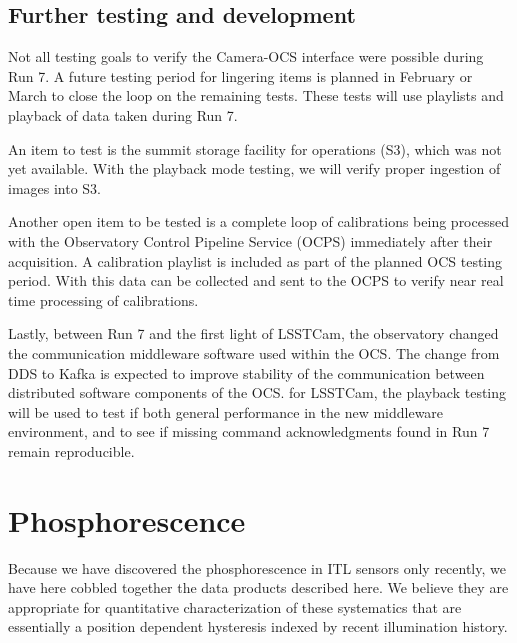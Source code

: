\subsection{Further testing and development}
Not all testing goals to verify the Camera-OCS interface were possible during Run 7. A future testing period for lingering items is planned in February or March to close the loop on the remaining tests. These tests will use playlists and playback of data taken during Run 7.

An item to test is the summit storage facility for operations (S3), which was not yet available. With the playback mode testing, we will verify proper ingestion of images into S3.

Another open item to be tested is a complete loop of calibrations being processed with the Observatory Control Pipeline Service (OCPS) immediately after their acquisition. A calibration playlist is included as part of the planned OCS testing period. With this data can be collected and sent to the OCPS to verify near real time processing of calibrations.

Lastly, between Run 7 and the first light of LSSTCam, the observatory changed the communication middleware software used within the OCS. The change from DDS to Kafka is expected to improve stability of the communication between distributed software components of the OCS. for LSSTCam, the playback testing will be used to test if both general performance in the new middleware environment, and to see if missing command acknowledgments found in Run 7 remain reproducible. 

\clearpage
\section{Phosphorescence}\label{appendix:phosphorescence}
Because we have discovered the phosphorescence in ITL sensors only recently, we have here cobbled together the data products described here. We believe they are appropriate for quantitative characterization of these systematics that are essentially a position dependent hysteresis indexed by recent illumination history. 

